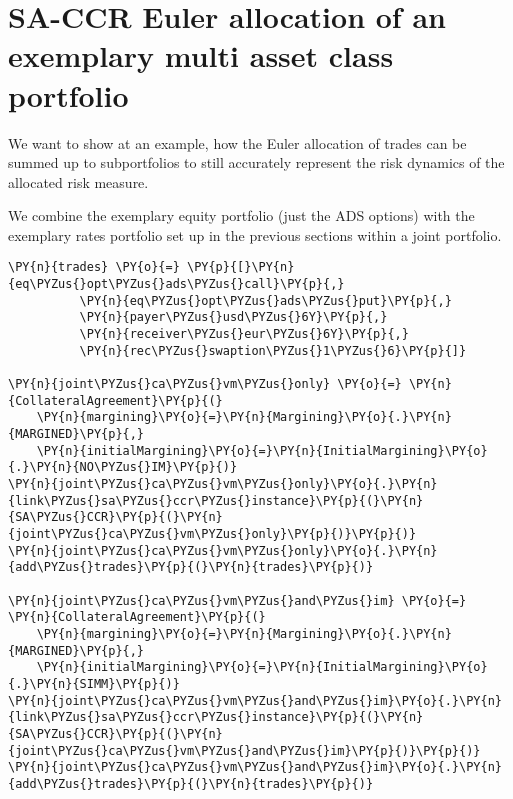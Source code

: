     

    
    \hypertarget{sa-ccr-euler-allocation-of-an-exemplary-multi-asset-class-portfolio}{%
\section{SA-CCR Euler allocation of an exemplary multi asset class
portfolio}\label{sa-ccr-euler-allocation-of-an-exemplary-multi-asset-class-portfolio}}

We want to show at an example, how the Euler allocation of trades can be
summed up to subportfolios to still accurately represent the risk
dynamics of the allocated risk measure.

We combine the exemplary equity portfolio (just the ADS options) with
the exemplary rates portfolio set up in the previous sections within a
joint portfolio.

    \begin{tcolorbox}[breakable, size=fbox, boxrule=1pt, pad at break*=1mm,colback=cellbackground, colframe=cellborder]
\begin{Verbatim}[commandchars=\\\{\}]
\PY{n}{trades} \PY{o}{=} \PY{p}{[}\PY{n}{eq\PYZus{}opt\PYZus{}ads\PYZus{}call}\PY{p}{,}
          \PY{n}{eq\PYZus{}opt\PYZus{}ads\PYZus{}put}\PY{p}{,}
          \PY{n}{payer\PYZus{}usd\PYZus{}6Y}\PY{p}{,}
          \PY{n}{receiver\PYZus{}eur\PYZus{}6Y}\PY{p}{,}
          \PY{n}{rec\PYZus{}swaption\PYZus{}1\PYZus{}6}\PY{p}{]}

\PY{n}{joint\PYZus{}ca\PYZus{}vm\PYZus{}only} \PY{o}{=} \PY{n}{CollateralAgreement}\PY{p}{(}
    \PY{n}{margining}\PY{o}{=}\PY{n}{Margining}\PY{o}{.}\PY{n}{MARGINED}\PY{p}{,}
    \PY{n}{initialMargining}\PY{o}{=}\PY{n}{InitialMargining}\PY{o}{.}\PY{n}{NO\PYZus{}IM}\PY{p}{)}
\PY{n}{joint\PYZus{}ca\PYZus{}vm\PYZus{}only}\PY{o}{.}\PY{n}{link\PYZus{}sa\PYZus{}ccr\PYZus{}instance}\PY{p}{(}\PY{n}{SA\PYZus{}CCR}\PY{p}{(}\PY{n}{joint\PYZus{}ca\PYZus{}vm\PYZus{}only}\PY{p}{)}\PY{p}{)}
\PY{n}{joint\PYZus{}ca\PYZus{}vm\PYZus{}only}\PY{o}{.}\PY{n}{add\PYZus{}trades}\PY{p}{(}\PY{n}{trades}\PY{p}{)}

\PY{n}{joint\PYZus{}ca\PYZus{}vm\PYZus{}and\PYZus{}im} \PY{o}{=} \PY{n}{CollateralAgreement}\PY{p}{(}
    \PY{n}{margining}\PY{o}{=}\PY{n}{Margining}\PY{o}{.}\PY{n}{MARGINED}\PY{p}{,}
    \PY{n}{initialMargining}\PY{o}{=}\PY{n}{InitialMargining}\PY{o}{.}\PY{n}{SIMM}\PY{p}{)}
\PY{n}{joint\PYZus{}ca\PYZus{}vm\PYZus{}and\PYZus{}im}\PY{o}{.}\PY{n}{link\PYZus{}sa\PYZus{}ccr\PYZus{}instance}\PY{p}{(}\PY{n}{SA\PYZus{}CCR}\PY{p}{(}\PY{n}{joint\PYZus{}ca\PYZus{}vm\PYZus{}and\PYZus{}im}\PY{p}{)}\PY{p}{)}
\PY{n}{joint\PYZus{}ca\PYZus{}vm\PYZus{}and\PYZus{}im}\PY{o}{.}\PY{n}{add\PYZus{}trades}\PY{p}{(}\PY{n}{trades}\PY{p}{)}
\end{Verbatim}
\end{tcolorbox}


